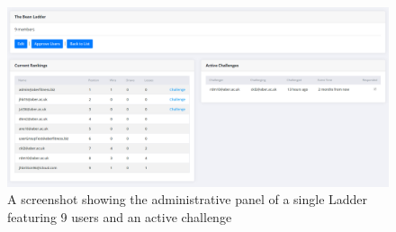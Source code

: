 \begin{figure}[H]
    \centering
    \includegraphics[width=\textwidth]{Images/service_ladders.png}
    \caption{A screenshot showing the administrative panel of a single Ladder featuring 9 users and an active challenge}
\end{figure}